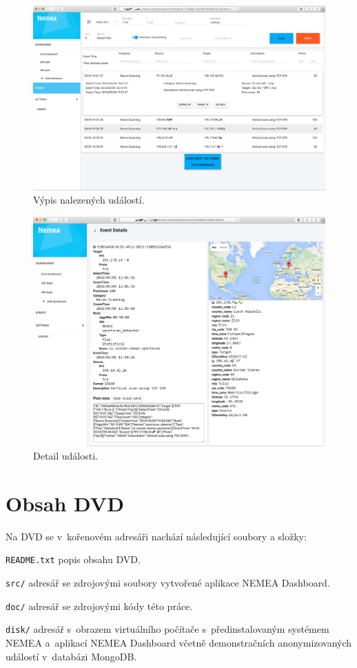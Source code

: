 \begin{figure}[ht]
    \centering
    \includegraphics[width=1\textwidth]{fig/screen_after_2.png}
    \caption{Výpis nalezených událostí.} \label{screen:after:2}
\end{figure}

\begin{figure}[ht]
    \centering
    \includegraphics[width=1\textwidth]{fig/screen_after_3.png}
    \caption{Detail události.} \label{screen:after:3}
\end{figure}



\chapter{Obsah DVD}

Na DVD se v~kořenovém adresáři nachází následující soubory a složky:

\begin{description}
    \item \texttt{README.txt} popis obsahu DVD.
    \item \texttt{src/} adresář se zdrojovými soubory vytvořené aplikace NEMEA Dashboard.
    \item \texttt{doc/} adresář se zdrojovými kódy této práce.
    \item \texttt{disk/} adresář s~obrazem virtuálního počítače s~předinstalovaným systémem NEMEA a~aplikací NEMEA Dashboard včetně demonstračních anonymizovaných událostí v~databázi MongoDB.
\end{description}

